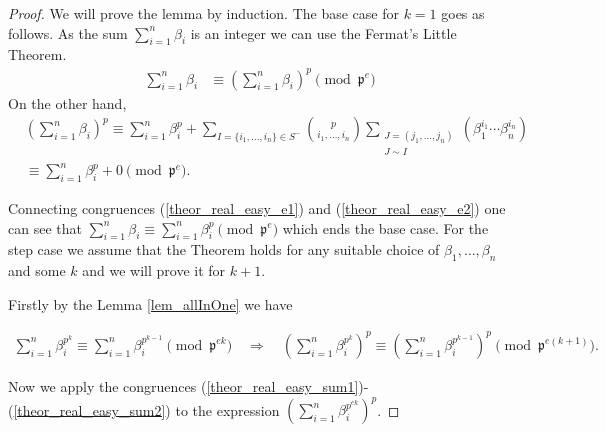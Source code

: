\documentclass[preprint,12pt]{elsarticle}
\newcommand{\pp}{\mathfrak{p} }
\begin{document}
\begin{proof}
    We will prove the lemma by induction. The base case for $k=1$ goes as follows. As the sum $\sum_{i=1}^n \beta_i$ is an integer we can use the Fermat's Little Theorem.
    \begin{align}\label{theor_real_easy_e1}
        \sum_{i=1}^n \beta_i &\equiv \left(\sum_{i=1}^n \beta_i\right)^p\pmod {\pp^e}
    \end{align}
    On the other hand,  
    \begin{equation}
        \begin{split}\label{theor_real_easy_e2}
        &\left(\sum_{i=1}^n \beta_i\right)^p 
        \equiv 
        \sum_{i=1}^n \beta_i^p + \sum_{I=\{i_1,\ldots, i_n\}\in S^-} \binom{p}{i_1, \ldots, i_n} \sum_{\substack{J=(j_1,\ldots, j_n) \\ J \sim I}}(\beta_1^{i_1}\cdots\beta_n^{i_n}) 
        \\&\equiv 
        \sum_{i=1}^n \beta_i^p  + 0%
        \pmod {\pp^e} . 
        \end{split}
    \end{equation}

    
    Connecting congruences (\ref{theor_real_easy_e1})  and (\ref{theor_real_easy_e2}) one can see that $\sum_{i=1}^n \beta_i \equiv  \sum_{i=1}^n \beta_i^p  \pmod {\pp^e}$ which ends the base case. For the step case we assume that the Theorem holds for any suitable choice of $\beta_1,\ldots,\beta_n$ and some $k$ and we will prove it for $k+1$.

    Firstly by the Lemma \ref{lem_allInOne} we have
    
    \begin{align} \label{theor_real_easy_e5}
        \sum_{i=1}^n \beta_i^{p^{k}} \equiv \sum_{i=1}^n \beta_i^{p^{k-1}} \pmod{\pp^{ek}} 
        \quad\Rightarrow\quad
        \left(\sum_{i=1}^n \beta_i^{p^{k}}\right)^p \equiv \left(\sum_{i=1}^n \beta_i^{p^{k-1}}\right)^p \pmod{\pp^{e(k+1)}}.
    \end{align}

    Now we apply the congruences (\ref{theor_real_easy_sum1})- (\ref{theor_real_easy_sum2}) to the expression $\left(\sum_{i=1}^n \beta_i^{p^{ek}}\right)^p$.


\end{proof}
\end{document}
